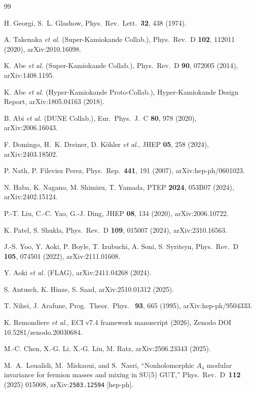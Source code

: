 \documentclass[reprint,prl,nofootinbib,floatfix,linenumbers]{revtex4-2}
\begin{document}
\begin{thebibliography}{99}

 H. Georgi, S.~L. Glashow, Phys.~Rev.~Lett.~{\bf 32},
438 (1974).

 A. Takenaka {\it et al.} (Super-Kamiokande Collab.),
Phys.~Rev.~D {\bf 102}, 112011 (2020), arXiv:2010.16098.

 K. Abe {\it et al.} (Super-Kamiokande Collab.),
Phys.~Rev.~D {\bf 90}, 072005 (2014), arXiv:1408.1195.

 K. Abe {\it et al.} (Hyper-Kamiokande Proto-Collab.),
Hyper-Kamiokande Design Report, arXiv:1805.04163 (2018).

 B. Abi {\it et al.} (DUNE Collab.), Eur.~Phys.~J.~C
{\bf 80}, 978 (2020), arXiv:2006.16043.

 F. Domingo, H.~K. Dreiner, D. K\"ohler {\it et al.},
JHEP {\bf 05}, 258 (2024), arXiv:2403.18502.

 P. Nath, P. Fileviez Perez, Phys.~Rep.~{\bf 441},
191 (2007), arXiv:hep-ph/0601023.

 N. Haba, K. Nagano, M. Shimizu, T. Yamada,
PTEP {\bf 2024}, 053B07 (2024), arXiv:2402.15124.

 P.-T. Liu, C.-C. Yao, G.-J. Ding, JHEP {\bf 08},
134 (2020), arXiv:2006.10722.

 K. Patel, S. Shukla, Phys.~Rev.~D {\bf 109},
015007 (2024), arXiv:2310.16563.

 J.-S. Yoo, Y. Aoki, P. Boyle, T. Izubuchi, A. Soni,
S. Syritsyn, Phys.~Rev.~D {\bf 105}, 074501 (2022), arXiv:2111.01608.

 Y. Aoki {\it et al.} (FLAG), arXiv:2411.04268 (2024).

 S. Antusch, K. Hinze, S. Saad,
arXiv:2510.01312 (2025).

 T. Nihei, J. Arafune, Prog.~Theor.~Phys.~
{\bf 93}, 665 (1995), arXiv:hep-ph/9504333.

 K. Remondiere {\it et al.}, ECI v7.4 framework
manuscript (2026), Zenodo DOI 10.5281/zenodo.20030684.

 M.-C. Chen, X.-G. Li, X.-G. Liu, M. Ratz,
arXiv:2506.23343 (2025).

 M.~A.~Loualidi, M.~Miskaoui, and S.~Nasri,
``Nonholomorphic $A_4$ modular invariance for fermion masses and mixing
  in SU(5) GUT,''
Phys.~Rev.~D~\textbf{112} (2025) 015008,
arXiv:\texttt{2503.12594} [hep-ph].

\end{thebibliography}
\end{document}
